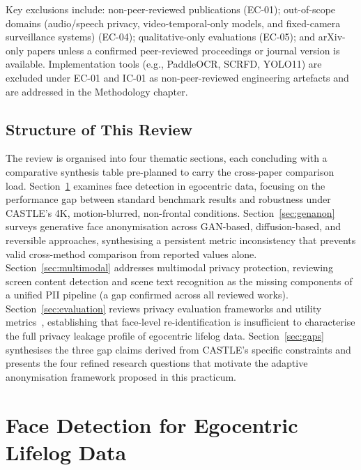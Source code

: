 \documentclass[12pt, onecolumn]{IEEEtran}
\begin{document}
Key exclusions include: non-peer-reviewed publications (EC-01); out-of-scope domains (audio/speech
privacy, video-temporal-only models, and fixed-camera surveillance systems) (EC-04); qualitative-only evaluations (EC-05); and
arXiv-only papers unless a confirmed peer-reviewed proceedings or journal version is available. Implementation tools (e.g., PaddleOCR, SCRFD, YOLO11) are excluded under EC-01 and IC-01 as non-peer-reviewed engineering artefacts and are addressed in the
Methodology chapter.

\subsection{Structure of This Review}

The review is organised into four thematic sections, each concluding with a comparative synthesis table
pre-planned to carry the cross-paper comparison load. Section~\ref{sec:facedetection} examines face detection in egocentric data, focusing on the performance gap between standard benchmark results and robustness under
CASTLE's 4K, motion-blurred, non-frontal conditions. Section~\ref{sec:genanon} surveys generative face anonymisation
across GAN-based, diffusion-based, and reversible approaches, synthesising a persistent
metric inconsistency that prevents valid cross-method comparison from reported values alone. Section~\ref{sec:multimodal}
addresses multimodal privacy protection, reviewing screen content detection and scene
text recognition as the missing components of a unified PII pipeline (a gap confirmed across all reviewed
works). Section~\ref{sec:evaluation} reviews privacy evaluation frameworks and utility metrics~\cite{li2025egoprivacy, kim2022adaface, deng2019arcface},
establishing that face-level re-identification is insufficient to characterise the full privacy leakage
profile of egocentric lifelog data. Section~\ref{sec:gaps} synthesises the three gap claims derived from CASTLE's specific
constraints and presents the four refined research questions that motivate the adaptive anonymisation
framework proposed in this practicum.








\section{Face Detection for Egocentric Lifelog Data}
\label{sec:facedetection}
\end{document}
